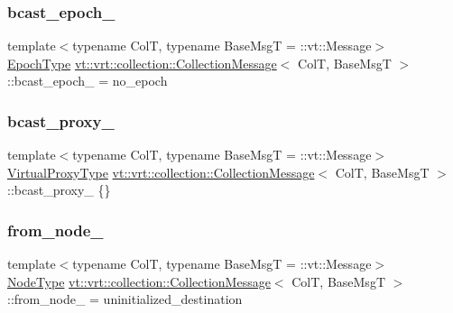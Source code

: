 \subsubsection{\texorpdfstring{bcast\+\_\+epoch\+\_\+}{bcast\_epoch\_}}
{\footnotesize\ttfamily template$<$typename ColT, typename Base\+MsgT = \+::vt\+::\+Message$>$ \\
\hyperlink{namespacevt_a985a5adf291c34a3ca263b3378388236}{Epoch\+Type} \hyperlink{structvt_1_1vrt_1_1collection_1_1_collection_message}{vt\+::vrt\+::collection\+::\+Collection\+Message}$<$ ColT, Base\+MsgT $>$\+::bcast\+\_\+epoch\+\_\+ = no\+\_\+epoch\hspace{0.3cm}{\ttfamily [private]}}

\mbox{\label{structvt_1_1vrt_1_1collection_1_1_collection_message_a7b1563ec7a2d15faba3b252304beefb6}} 
\subsubsection{\texorpdfstring{bcast\+\_\+proxy\+\_\+}{bcast\_proxy\_}}
{\footnotesize\ttfamily template$<$typename ColT, typename Base\+MsgT = \+::vt\+::\+Message$>$ \\
\hyperlink{namespacevt_a1b417dd5d684f045bb58a0ede70045ac}{Virtual\+Proxy\+Type} \hyperlink{structvt_1_1vrt_1_1collection_1_1_collection_message}{vt\+::vrt\+::collection\+::\+Collection\+Message}$<$ ColT, Base\+MsgT $>$\+::bcast\+\_\+proxy\+\_\+ \{\}\hspace{0.3cm}{\ttfamily [private]}}

\mbox{\label{structvt_1_1vrt_1_1collection_1_1_collection_message_aa129673e8d91d5e3e662f15ae0d8d5fa}} 
\subsubsection{\texorpdfstring{from\+\_\+node\+\_\+}{from\_node\_}}
{\footnotesize\ttfamily template$<$typename ColT, typename Base\+MsgT = \+::vt\+::\+Message$>$ \\
\hyperlink{namespacevt_a866da9d0efc19c0a1ce79e9e492f47e2}{Node\+Type} \hyperlink{structvt_1_1vrt_1_1collection_1_1_collection_message}{vt\+::vrt\+::collection\+::\+Collection\+Message}$<$ ColT, Base\+MsgT $>$\+::from\+\_\+node\+\_\+ = uninitialized\+\_\+destination\hspace{0.3cm}{\ttfamily [private]}}


